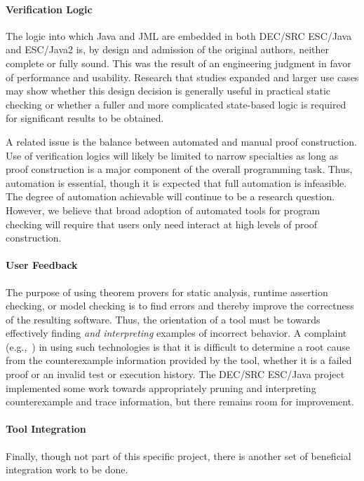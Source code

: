 \documentclass{sig-alternate}
\begin{document}
\paragraph*{Verification Logic} The logic into which Java and JML are
embedded in both DEC/SRC ESC/Java and ESC/Java2 is, by design and admission of the original
authors, neither complete or fully sound.  This was the result of an
engineering judgment in favor of performance and usability.  Research
that studies expanded and larger use cases may show whether this
design decision is generally useful in practical static checking or
whether a fuller and more complicated state-based logic is required
for significant results to be obtained. 

A related issue is the balance between automated and manual proof construction.
Use of verification logics will likely be limited to narrow specialties as long as proof
construction is a major component of the overall programming task.  Thus, automation
is essential, though it is expected that full automation is infeasible.  The degree of
automation achievable will continue to be a research question. 
However, we believe that broad adoption of automated tools for program checking 
will require that users only need interact at high levels of proof construction.

\paragraph*{User Feedback} The purpose of using theorem provers for
static analysis, runtime assertion checking, or model checking is to
find errors and thereby improve the correctness of the resulting
software.  Thus, the orientation of a tool must be towards effectively
finding \emph{and interpreting} examples of incorrect behavior.  A
complaint (e.g.,~\cite{GroceVisser03}) in using such technologies is that it is difficult
to determine a root cause from the counterexample information provided
by the tool, whether it is a failed proof or an invalid test or
execution history.  The DEC/SRC ESC/Java project implemented some work towards
appropriately pruning and interpreting counterexample and trace information, but
there remains room for improvement.

\paragraph*{Tool Integration} Finally, though not part of this specific
project, there is another set of beneficial integration work to be
done.
\end{document}
